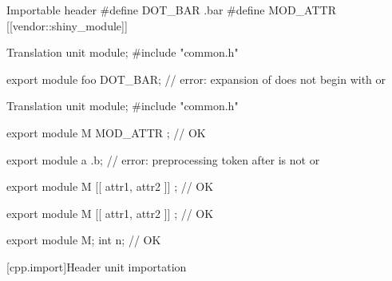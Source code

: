 \pnum
\begin{example}
\begin{codeblocktu}{Importable header }
#define DOT_BAR .bar
#define MOD_ATTR [[vendor::shiny_module]]
\end{codeblocktu}

\begin{codeblocktu}{Translation unit }
module;
#include "common.h"

export module foo DOT_BAR;      // error: expansion of  does not begin with \tcode{;} or \tcode{[}
\end{codeblocktu}

\begin{codeblocktu}{Translation unit }
module;
#include "common.h"

export module M MOD_ATTR ;      // OK
\end{codeblocktu}
\end{example}

\begin{example}
\begin{codeblock}
export module a
.b;                             // error: preprocessing token after  is not \tcode{;} or \tcode{[}
\end{codeblock}
\end{example}

\begin{example}
\begin{codeblock}
export module M [[
attr1,
attr2 ]] ;                      // OK
\end{codeblock}
\end{example}

\begin{example}
\begin{codeblock}
export module M
[[ attr1,
attr2 ]] ;                      // OK
\end{codeblock}
\end{example}

\begin{example}
\begin{codeblock}
export module M; int
n;                              // OK
\end{codeblock}
\end{example}

[cpp.import]{Header unit importation}
%
%
%

